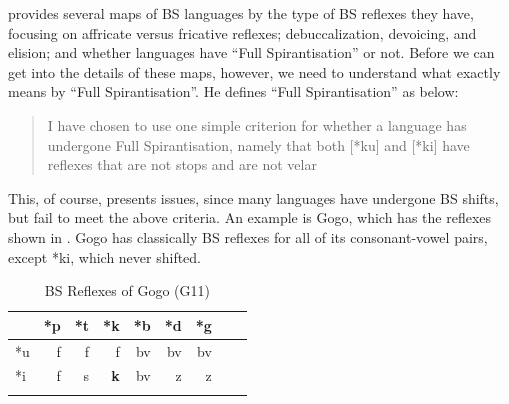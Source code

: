 \documentclass[output=paper,colorlinks,citecolor=brown
]{langscibook}
\begin{document}
\citeauthor{Janson2007} provides several maps of BS languages by the type of BS reflexes they have, focusing on affricate versus fricative reflexes; debuccalization, devoicing, and elision; and whether languages have “Full Spirantisation” or not. Before we can get into the details of these maps, however, we need to understand what exactly \citet[84]{Janson2007} means by “Full Spirantisation”. He defines “Full Spirantisation” as below:
\begin{quote}
    I have chosen to use one simple criterion for whether a language has undergone Full Spirantisation, namely that both [*ku] and [*ki] have reflexes that are not stops and are not velar
\end{quote}
This, of course, presents issues, since many languages have undergone BS shifts, but fail to meet the above criteria. An example is Gogo, which has the reflexes shown in . Gogo has classically BS reflexes for all of its consonant-vowel pairs, except *ki, which never shifted.

\begin{table}
\caption{BS Reflexes of Gogo (G11)
\citep{Janson2007}
}

\label{tab:kieffer:Gogo}
 \begin{tabular}{lrrrrrrrr}
  \lsptoprule
           & *p & *t & *k & *b & *d & *g\\
  \midrule
    *u & f & f & f & bv & bv & bv\\
    *i & f & s & \textbf{k} & bv & z & z\\
  \lspbottomrule
 \end{tabular}
\end{table}
\end{document}
